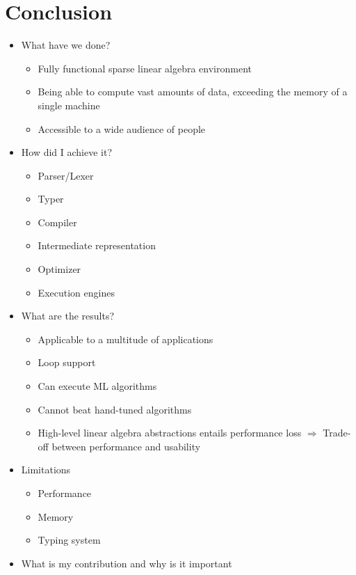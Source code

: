\chapter{Conclusion}
\label{cha:conclusion}


\begin{itemize}
	\item What have we done?
	\begin{itemize}
		\item Fully functional sparse linear algebra environment
		\item Being able to compute vast amounts of data, exceeding the memory of a single machine
		\item Accessible to a wide audience of people
	\end{itemize}
	\item How did I achieve it?
	\begin{itemize}
		\item Parser/Lexer
		\item Typer
		\item Compiler
		\item Intermediate representation
		\item Optimizer
		\item Execution engines
	\end{itemize}
	\item What are the results?
	\begin{itemize}
		\item Applicable to a multitude of applications
		\item Loop support
		\item Can execute ML algorithms
		\item Cannot beat hand-tuned algorithms
		\item High-level linear algebra abstractions entails performance loss $\Rightarrow$ Trade-off between performance and usability
	\end{itemize}
	\item Limitations
	\begin{itemize}
		\item Performance
		\item Memory
		\item Typing system
	\end{itemize}
	\item What is my contribution and why is it important

\end{itemize}

